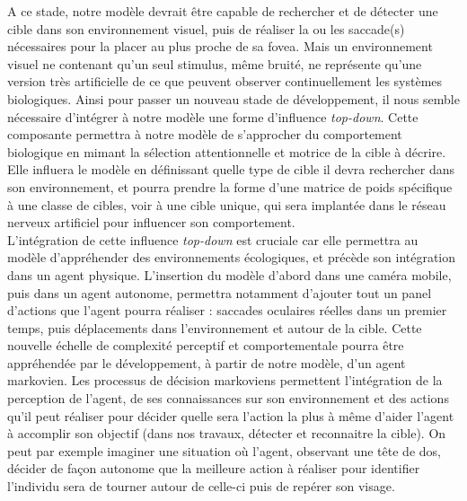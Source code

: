 A ce stade, notre modèle devrait être capable de rechercher et de détecter une cible dans son environnement visuel, puis de réaliser la ou les saccade(s) nécessaires pour la placer au plus proche de sa fovea.
Mais un environnement visuel ne contenant qu'un seul stimulus, même bruité, ne représente qu'une version très artificielle de ce que peuvent observer continuellement les systèmes biologiques.
Ainsi pour passer un nouveau stade de développement, il nous semble nécessaire d'intégrer à notre modèle une forme d'influence \textit{top-down}.
Cette composante permettra à notre modèle de s'approcher du comportement biologique en mimant la sélection attentionnelle et motrice de la cible à décrire.
Elle influera le modèle en définissant quelle type de cible il devra rechercher dans son environnement, et pourra prendre la forme d'une matrice de poids spécifique à une classe de cibles, voir à une cible unique, qui sera implantée dans le réseau nerveux artificiel pour influencer son comportement. \autocite{Werner2014} \\
L'intégration de cette influence \textit{top-down} est cruciale car elle permettra au modèle d'appréhender des environnements écologiques, et précède son intégration dans un agent physique.
L'insertion du modèle d'abord dans une caméra mobile, puis dans un agent autonome, permettra notamment d'ajouter tout un panel d'actions que l'agent pourra réaliser : saccades oculaires réelles dans un premier temps, puis déplacements dans l'environnement et autour de la cible.
Cette nouvelle échelle de complexité perceptif et comportementale pourra être appréhendée par le développement, à partir de notre modèle, d'un agent markovien.
Les processus de décision markoviens permettent l'intégration de la perception de l'agent, de ses connaissances sur son environnement et des actions qu'il peut réaliser pour décider quelle sera l'action la plus à même d'aider l'agent à accomplir son objectif (dans nos travaux, détecter et reconnaitre la cible).
On peut par exemple imaginer une situation où l'agent, observant une tête de dos, décider de façon autonome que la meilleure action à réaliser pour identifier l'individu sera de tourner autour de celle-ci puis de repérer son visage. \autocite{Butko2010, Najemnik2005, Zhaoping2014} \\